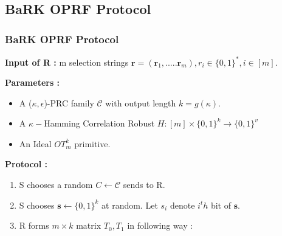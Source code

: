 \documentclass[hyperref={pdfpagelabels=false}]{beamer}
\theoremstyle{remark}
\begin{document}
\subsection{BaRK OPRF Protocol}

\begin{frame}
\frametitle{BaRK OPRF Protocol}
\textbf{Input of R :} m selection strings $\mathbf{r} = (\mathbf{r}_1,.....\mathbf{r}_m), r_i \in \{0,1\}^*, i \in [m]$.\par \pause
\textbf{Parameters :}
\begin{itemize}
\item A ($\kappa ,\epsilon$)-PRC family $\mathcal{C}$ with output length $k=g(\kappa)$.\pause
\item A $\kappa-$Hamming Correlation Robust $H:[m] \times \{0,1\}^k \rightarrow \{0,1\}^v$ \pause
\item An Ideal $OT_m^k$ primitive.\pause
\end{itemize}
\textbf{Protocol :}\pause
\begin{enumerate}
\item S chooses a random $C \leftarrow \mathcal{C}$ sends to R.\pause
\item S chooses $\mathbf{s} \leftarrow \{0,1\}^k$ at random. Let $s_i$ denote $i^th$ bit of $\mathbf{s}$.\pause
\item R forms $m \times k$ matrix $T_0, T_1$ in following way :
\end{enumerate}

\end{frame}
\end{document}
